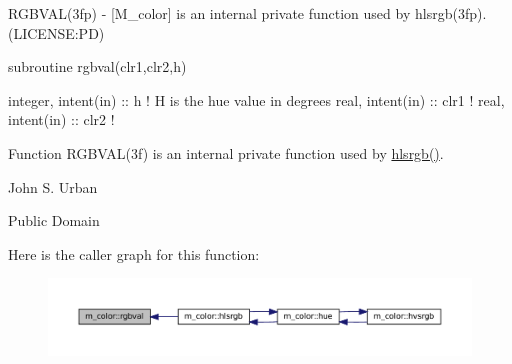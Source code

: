 \begin{DoxyDescription}
\item[\label{_RGBVAL}%
N\+A\+ME ]R\+G\+B\+V\+A\+L(3fp) -\/ \mbox{[}M\+\_\+color\mbox{]} is an internal private function used by hlsrgb(3fp). (L\+I\+C\+E\+N\+SE\+:PD) 


\item[S\+Y\+N\+O\+P\+S\+IS]
\begin{DoxyPre}
    subroutine rgbval(clr1,clr2,h)\end{DoxyPre}



\begin{DoxyPre}     integer, intent(in) :: h ! H is the hue value in degrees
     real, intent(in) :: clr1 !
     real, intent(in) :: clr2 !
    \end{DoxyPre}
 


\item[D\+E\+S\+C\+R\+I\+P\+T\+I\+ON ]Function R\+G\+B\+V\+A\+L(3f) is an internal private function used by \mbox{\hyperlink{namespacem__color_a40e6c91da216384eded2157cdaf86eba}{hlsrgb()}}.




\item[A\+U\+T\+H\+OR ]

John S. Urban




\item[L\+I\+C\+E\+N\+SE ]

Public Domain




\end{DoxyDescription}Here is the caller graph for this function\+:
\nopagebreak
\begin{figure}[H]
\begin{center}
\leavevmode
\includegraphics[width=350pt]{namespacem__color_a3e97e24dba7b820f685f13eaa64a6caa_icgraph}
\end{center}
\end{figure}
\mbox{\label{namespacem__color_a386d004a1392b7e01ff66f1676d43def}} 

